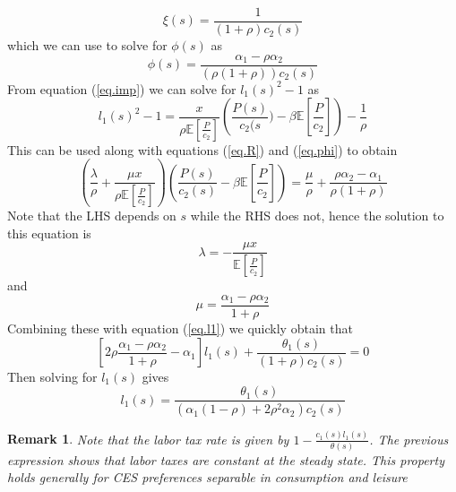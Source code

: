 \documentclass[thmsb,11pt]{article}
\newtheorem{remark}{Remark}
\begin{document}
\begin{equation}
\xi(s) = \frac1{\left(1+\rho\right)c_2(s)}\label{eq.xi}
\end{equation}%
which we can use to solve for $\phi(s)$ as
\begin{equation}
\phi(s) = \frac{\alpha_1-\rho\alpha_2}{\left(\rho(1+\rho)\right)c_2(s)}
\label{eq.phi}
\end{equation}
From equation (\ref{eq.imp}) we can solve for $l_1(s)^2 -1$ as
\begin{equation*}
l_1(s)^2-1 = \frac{x}{\rho\mathbb{E}[\frac{P}{c_2}]}\left(\frac
{P(s)}{c_2(s})-\beta\mathbb{E}\left[\frac{P}{c_2}\right]\right)-\frac1\rho
\end{equation*}%
This can be used along with equations (\ref{eq.R}) and (\ref{eq.phi}) to
obtain
\begin{equation*}
\left(\frac\lambda \rho+\frac{\mu x}{\rho\mathbb{E}[\frac{P}{c_2}]}%
\right)\left(\frac{P(s)}{c_2(s)}-\beta\mathbb{E}\left[\frac{P}{c_2}\right]%
\right) = \frac{\mu}{\rho}+\frac{\rho\alpha_2-\alpha_1}{\rho(1+\rho)}
\end{equation*}
Note that the LHS depends on $s$ while the RHS does not, hence the solution to
this equation is
\begin{equation}
\lambda = - \frac{\mu x}{\mathbb{E}[\frac{P}{c_2}]}
\end{equation}%
and
\begin{equation}
\mu = \frac{\alpha_1-\rho\alpha_2}{1+\rho}  \label{eq.mu}
\end{equation}
Combining these with equation (\ref{eq.l1}) we quickly obtain that
\begin{equation*}
\left[2\rho\frac{\alpha_1-\rho\alpha_2}{1+\rho}-\alpha_1\right]%
l_1(s)+\frac{\theta_1(s)}{\left(1+\rho\right)c_2(s)} = 0
\end{equation*}%
Then solving for $l_1(s)$ gives
\begin{equation*}
l_1(s) = \frac{\theta_1(s)}{\left(\alpha_1(1-\rho)+2\rho^2\alpha_2\right)c_2(s)}
\end{equation*}

\begin{remark}
Note that the labor tax rate is given by $1-\frac{c_1(s)l_1(s)}{\theta(s)}$. The previous expression shows that labor taxes are constant at the steady state. This property holds generally for CES preferences separable in consumption and leisure
\end{remark}
\end{document}
